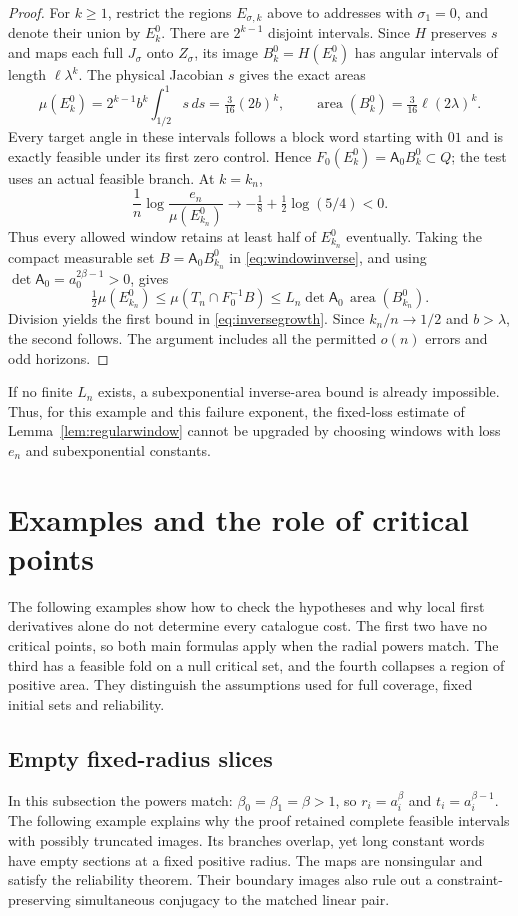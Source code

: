 \documentclass[11pt]{amsart}
\theoremstyle{definition}
\theoremstyle{remark}
\newcommand{\area}{\operatorname{area}}
\numberwithin{equation}{section}
\begin{document}
\begin{proof}
For $k\ge1$, restrict the regions $E_{\sigma,k}$ above to
addresses with $\sigma_1=0$, and denote their union by $E_k^0$.
There are $2^{k-1}$ disjoint intervals. Since $H$ preserves $s$
and maps each full $J_\sigma$ onto $Z_\sigma$, its image
$B_k^0=H(E_k^0)$ has angular intervals of length $\ell\lambda^k$.
The physical Jacobian $s$ gives the exact areas
\[
\mu(E_k^0)=2^{k-1}b^k\int_{1/2}^1s\,ds
          =\tfrac3{16}(2b)^k,
\qquad
\area(B_k^0)=\tfrac3{16}\ell(2\lambda)^k.
\]
Every target angle in these intervals follows a block word starting
with $01$ and is exactly feasible under its first zero control.
Hence $F_0(E_k^0)=\mathsf A_0B_k^0\subset Q$; the test uses
an actual feasible branch. At $k=k_n$,
\[
\frac1n\log\frac{e_n}{\mu(E_{k_n}^0)}
 \longrightarrow-\tfrac18+\tfrac12\log(5/4)<0.
\]
Thus every allowed window retains at least half of $E_{k_n}^0$
eventually. Taking the compact measurable set
$B=\mathsf A_0B_{k_n}^0$ in \eqref{eq:windowinverse}, and using
$\det\mathsf A_0=a_0^{2\beta-1}>0$, gives
\[
\tfrac12\mu(E_{k_n}^0)
 \le\mu(T_n\cap F_0^{-1}B)
 \le L_n\det\mathsf A_0\,\area(B_{k_n}^0).
\]
Division yields the first bound in \eqref{eq:inversegrowth}.
Since $k_n/n\to1/2$ and $b>\lambda$, the second follows.
The argument includes all the permitted $o(n)$ errors and odd horizons.
\end{proof}

If no finite $L_n$ exists, a subexponential inverse-area bound is
already impossible. Thus, for this example and this failure exponent,
the fixed-loss estimate of Lemma~\ref{lem:regularwindow} cannot
be upgraded by choosing windows with loss $e_n$ and subexponential
constants.

\section{Examples and the role of critical points}\label{sec:examples}
The following examples show how to check the hypotheses and why
local first derivatives alone do not determine every catalogue cost.
The first two have no critical points, so both main formulas apply
when the radial powers match.
The third has a feasible fold on a null critical set, and the fourth
collapses a region of positive area. They distinguish the assumptions
used for full coverage, fixed initial sets and reliability.

\subsection{Empty fixed-radius slices}
\label{sec:inward}
In this subsection the powers match: $\beta_0=\beta_1=\beta>1$,
so $r_i=a_i^\beta$ and $t_i=a_i^{\beta-1}$.
The following example explains why the proof retained complete
feasible intervals with possibly truncated images. Its branches
overlap, yet long constant words have empty sections at a fixed
positive radius. The maps are nonsingular and satisfy the
reliability theorem. Their boundary images also rule out a
constraint-preserving simultaneous conjugacy to the matched
linear pair.
\end{document}
